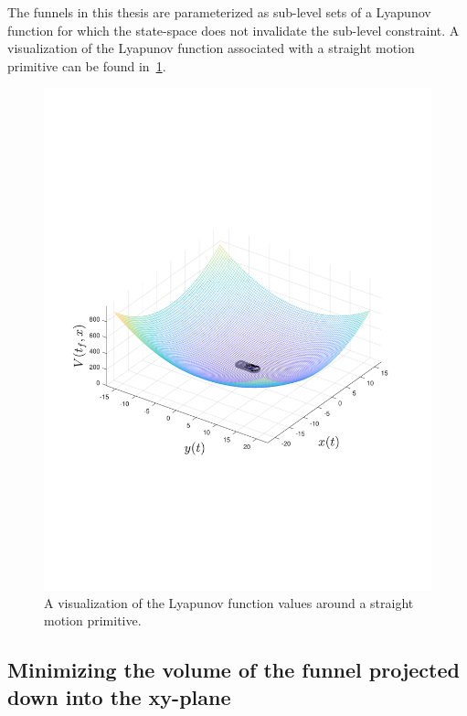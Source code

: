 The funnels in this thesis are parameterized as sub-level sets of a Lyapunov
function for which the state-space does not invalidate the sub-level constraint.
A visualization of the Lyapunov function associated with a straight motion
primitive can be found in~\cref{fig:visualized-lyapunov}.
\begin{figure}
  \centering \includegraphics[trim={3cm 7cm 3cm 7cm},
  scale=.6]{figures/rrtfunnel/straight-funnel-lyapunov-3d}
  \caption{A visualization of the Lyapunov function values around a straight
    motion primitive.}
  \label{fig:visualized-lyapunov}
\end{figure}

\subsection{Minimizing the volume of the funnel projected down into the
  xy-plane}
\label{subsec:xy-cost-function}

